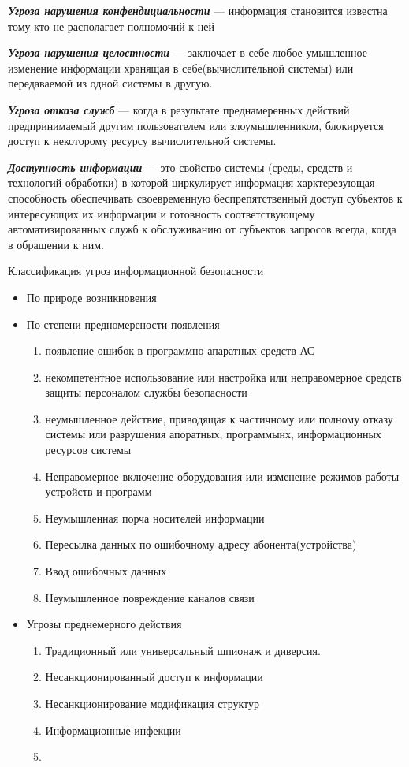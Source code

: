 \documentclass[a4paper,14pt]{extarticle}
\begin{document}
	\textbf{\textit{Угроза нарушения конфендициальности}} --- информация становится известна тому кто не располагает полномочий к ней
	
	\textit{\textbf{Угроза нарушения целостности}} --- заключает в себе любое умышленное изменение информации хранящая в себе(вычислительной системы) или передаваемой из одной системы в другую. 
	
	\textbf{\textit{Угроза отказа служб}} --- когда в результате преднамеренных действий предпринимаемый другим пользователем или злоумышленником, блокируется доступ к некоторому ресурсу вычислительной системы.
	
	\textbf{\textit{Доступность информации}} --- это свойство системы (среды, средств и технологий  обработки) в которой циркулирует информация харктерезующая способность обеспечивать своевременную беспрепятственный доступ субъектов к интересующих их информации и готовность соответствующему автоматизированных служб к обслуживанию от субъектов запросов всегда, когда в обращении к ним.
	
	{\centering Классификация угроз информационной безопасности}
	\begin{itemize}
		\item По природе возникновения 
		\item По степени предномерености появления
		\begin{enumerate}
			\item появление ошибок в программно-апаратных средств АС
			\item некомпетентное использование или настройка или неправомерное средств защиты персоналом службы безопасности
			\item неумышленное действие, приводящая к частичному или полному отказу системы или разрушения апоратных, программынх, информационных ресурсов системы
			\item Неправомерное включение оборудования или изменение режимов работы устройств и программ
			\item Неумышленная порча носителей информации 
			\item Пересылка данных по ошибочному адресу абонента(устройства)
			\item Ввод ошибочных данных
			\item Неумышленное повреждение каналов связи 
		\end{enumerate}
		\item Угрозы преднемерного действия
		\begin{enumerate}
			\item Традиционный или универсальный шпионаж и диверсия.
			\item Несанкционированный доступ к информации 
			\item Несанкционирование модификация структур
			\item Информационные инфекции 
			\item 
		\end{enumerate}
	\end{itemize}
\end{document}
